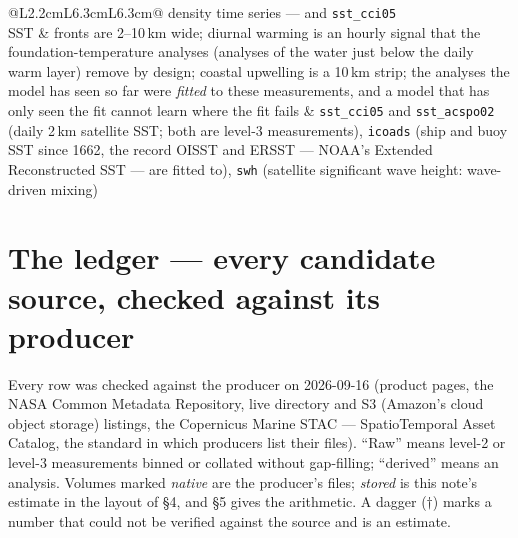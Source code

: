 \documentclass[10pt]{article}
\newcommand{\code}[1]{\texttt{#1}}
\begin{document}
\begin{table}[h]
\begin{tabular}{@{}L{2.2cm}L{6.3cm}L{6.3cm}@{}}
density time series --- and \code{sst\_cci05} \\
\addlinespace
SST & fronts are 2--10\,km wide; diurnal warming is an hourly signal that the
foundation-temperature analyses (analyses of the water just below the daily warm layer) remove by design; coastal upwelling is a
10\,km strip; the analyses the model has seen so far were \emph{fitted} to
these measurements, and a model that has only seen the fit cannot learn where
the fit fails &
\code{sst\_cci05} and \code{sst\_acspo02} (daily 2\,km satellite SST; both are level-3 measurements), \code{icoads}
(ship and buoy SST since 1662, the record OISST and ERSST --- NOAA's Extended Reconstructed SST --- are fitted to),
\code{swh} (satellite significant wave height: wave-driven mixing) \\
\bottomrule
\end{tabular}
\caption{The mechanism each goal has at fine scale, and the stores that measure it.}
\end{table}

\section{The ledger --- every candidate source, checked against its producer}

Every row was checked against the producer on 2026-09-16 (product pages, the
NASA Common Metadata Repository, live directory and S3 (Amazon's cloud object storage) listings, the
Copernicus Marine STAC --- SpatioTemporal Asset Catalog, the standard in which producers list their files). ``Raw'' means level-2 or level-3 measurements binned
or collated without gap-filling; ``derived'' means an analysis. Volumes marked
\emph{native} are the producer's files; \emph{stored} is this note's estimate
in the layout of \S4, and \S5 gives the arithmetic. A dagger ($\dagger$)
marks a number that could not be verified against the source and is an
estimate.
\end{document}
